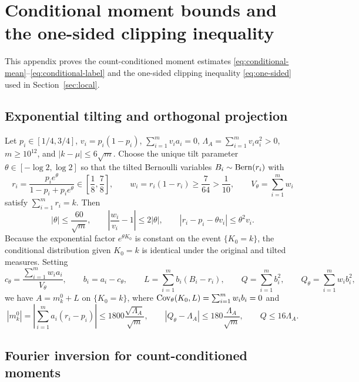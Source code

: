 \section{Conditional moment bounds and the one-sided clipping inequality}
\label{app:conditional}

This appendix proves the count-conditioned moment estimates
\eqref{eq:conditional-mean}--\eqref{eq:conditional-label} and the one-sided
clipping inequality \eqref{eq:one-sided} used in Section~\ref{sec:local}.

\subsection{Exponential tilting and orthogonal projection}

Let $p_i\in[1/4,3/4]$, $v_i=p_i(1-p_i)$, $\sum_{i=1}^m v_i a_i=0$,
$\Lambda_A=\sum_{i=1}^m v_i a_i^2>0$, $m\ge10^{12}$, and $|k-\mu|\le6\sqrt m$.
Choose the unique tilt parameter $\theta\in[-\log2,\log2]$ so that the tilted
Bernoulli variables $B_i\sim\operatorname{Bern}(r_i)$ with
\[
 r_i=\frac{p_i e^\theta}{1-p_i+p_i e^\theta}\in\left[\frac18,\frac78\right],\qquad
 w_i=r_i(1-r_i)\ge\frac7{64}>\frac1{10},\qquad V_\theta=\sum_{i=1}^m w_i
\]
satisfy $\sum_{i=1}^m r_i=k$. Then
\begin{equation}\label{eq:tilt-quantities}
 |\theta|\le\frac{60}{\sqrt m},\qquad \left|\frac{w_i}{v_i}-1\right|\le2|\theta|,
       \qquad |r_i-p_i-\theta v_i|\le\theta^2v_i.
\end{equation}
Because the exponential factor $e^{\theta K_0}$ is constant on the event
$\{K_0=k\}$, the conditional distribution given $K_0=k$ is identical under
the original and tilted measures. Setting
\[
 c_\theta=\frac{\sum_{i=1}^mw_i a_i}{V_\theta},\qquad b_i=a_i-c_\theta,
 \qquad L=\sum_{i=1}^m b_i(B_i-r_i),\qquad Q=\sum_{i=1}^m b_i^2,
 \qquad Q_\theta=\sum_{i=1}^mw_i b_i^2,
\]
we have $A=m_k^0+L$ on $\{K_0=k\}$, where $\operatorname{Cov}_\theta(K_0,L)=\sum_{i=1}^mw_ib_i=0$
and
\begin{equation}\label{eq:tilted-gap-data}
 |m_k^0|=\left|\sum_{i=1}^m a_i(r_i-p_i)\right|
      \le1800\frac{\sqrt{\Lambda_A}}{\sqrt m},\qquad
 |Q_\theta-\Lambda_A|\le180\frac{\Lambda_A}{\sqrt m},
 \qquad Q\le16\Lambda_A.
\end{equation}

\subsection{Fourier inversion for count-conditioned moments}

